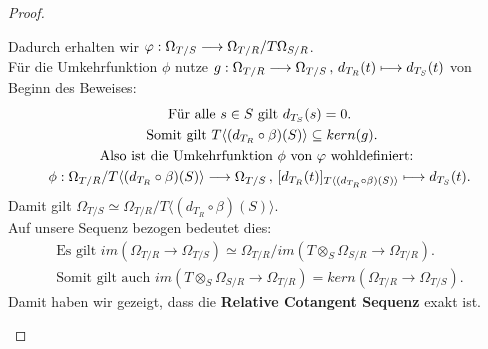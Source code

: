 \documentclass[10pt,a4paper]{report}
\newcommand{\functionfront}[3]{\nolinebreak{#1:#2 \longrightarrow #3}}
\newcommand{\function}[5]{\nolinebreak{#1:#2 \longrightarrow #3 \, , \, #4 \longmapsto #5}}
\newcommand{\divR}[2]{\Omega_{#1/#2}}
\newcommand{\divf}[1]{d_{#1}}
\newcommand{\Tensor}[3]{#1 \otimes_{#2} #3}
\newcommand{\kernel}[1]{kern(#1)}
\newcommand{\immage}[1]{im(#1)}
\begin{document}
\begin{proof}
\begin{itemize}
\begin{center}
\end{center}
Dadurch erhalten wir $\functionfront{\varphi}{\divR{T}{S}}{\divR{T}{R}/T \divR{S}{R}}$.\\
Für die Umkehrfunktion $\phi$ nutze $\function{g}{\divR{T}{R}}{\divR{T}{S}}{\divf{T_R}(t)}{\divf{T_S}(t)}$ von Beginn des Beweises:
\begin{gather*}
\text{Für alle } s \in S \text{ gilt } \divf{T_S}(s) = 0.\\
\text{ Somit gilt } T \langle (\divf{T_R} \circ \beta)(S) \rangle \subseteq \kernel{g}.\\
\text{Also ist die Umkehrfunktion $\phi$ von $\varphi$ wohldefiniert: }\\
 \function{\phi}{\divR{T}{R}/T \langle (\divf{T_R} \circ \beta)(S) \rangle}{\divR{T}{S}}{[\divf{T_R}(t)]_{T \langle (\divf{T_R} \circ \beta)(S) \rangle}}{\divf{T_S}(t)}.
\end{gather*}
Damit gilt $\divR{T}{S} \simeq \divR{T}{R}/T \langle (\divf{T_R} \circ \beta)(S) \rangle$.\\
Auf unsere Sequenz bezogen bedeutet dies:
\begin{gather*}
\text{Es gilt } \immage{\divR{T}{R} \rightarrow \divR{T}{S}} \simeq \divR{T}{R} / \immage{\Tensor{T}{S}{\divR{S}{R}} \rightarrow \divR{T}{R}}.\\
\text{Somit gilt auch } \immage{ \Tensor{T}{S}{\divR{S}{R}} \rightarrow \divR{T}{R} } = \kernel{ \divR{T}{R} \rightarrow \divR{T}{S} }. 
\end{gather*}
Damit haben wir gezeigt, dass die \textbf{Relative Cotangent Sequenz} exakt ist.
\end{itemize}
\end{proof}
\end{document}
